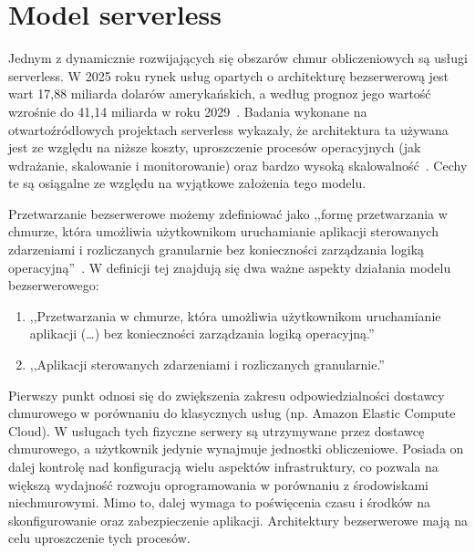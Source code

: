 \label{chapter:wstep}

\section{Model serverless}\label{chapter:model_serverless}
Jednym z dynamicznie rozwijających się obszarów chmur obliczeniowych są usługi serverless. 
W 2025 roku rynek usług opartych o architekturę bezserwerową jest wart 17,88 miliarda dolarów amerykańskich, 
a według prognoz jego wartość wzrośnie do 41,14 miliarda w roku 2029~\cite{serverlessArchitectureMarketReport}. 
Badania wykonane na otwartoźródłowych projektach serverless wykazały, 
że architektura ta używana jest ze względu na niższe koszty, uproszczenie procesów operacyjnych (jak wdrażanie, skalowanie i monitorowanie) 
oraz bardzo wysoką skalowalność~\cite{ServerlessApplicationsWhyWhenAndHow}. 
Cechy te są osiągalne ze względu na wyjątkowe założenia tego modelu.

Przetwarzanie bezserwerowe możemy zdefiniować jako 
,,formę przetwarzania w chmurze, która umożliwia użytkownikom uruchamianie aplikacji sterowanych zdarzeniami i rozliczanych granularnie bez konieczności zarządzania logiką operacyjną''~\cite{SpecRgCloudGroupVisionOnThePerformanceChallengesOfFaas}.
W definicji tej znajdują się dwa ważne aspekty działania modelu bezserwerowego:

\begin{enumerate}
    \item ,,Przetwarzania w chmurze, która umożliwia użytkownikom uruchamianie aplikacji (\dots) bez konieczności zarządzania logiką operacyjną.''
    \item ,,Aplikacji sterowanych zdarzeniami i rozliczanych granularnie.''
\end{enumerate}

Pierwszy punkt odnosi się do zwiększenia zakresu odpowiedzialności dostawcy chmurowego w porównaniu do klasycznych usług (np. Amazon Elastic Compute Cloud). 
W usługach tych fizyczne serwery są utrzymywane przez dostawcę chmurowego, a użytkownik jedynie wynajmuje jednostki obliczeniowe. 
Posiada on dalej kontrolę nad konfiguracją wielu aspektów infrastruktury, co pozwala na większą wydajność rozwoju oprogramowania w porównaniu z środowiskami niechmurowymi. 
Mimo to, dalej wymaga to poświęcenia czasu i środków na skonfigurowanie oraz zabezpieczenie aplikacji. 
Architektury bezserwerowe mają na celu uproszczenie tych procesów.

